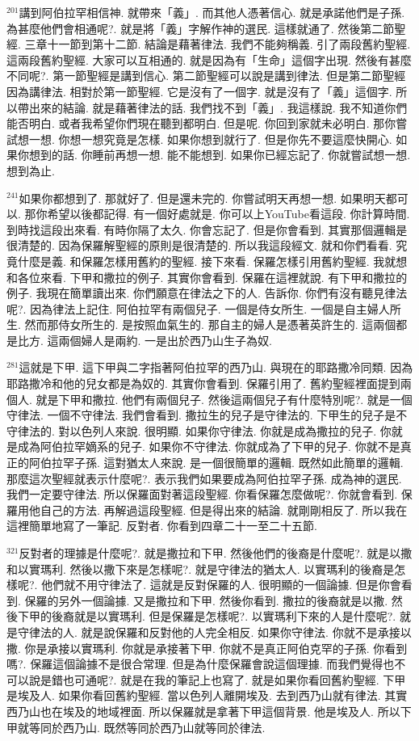 \documentclass{book}
\begin{document}
$^{201}$講到阿伯拉罕相信神.
就帶來「義」.
而其他人憑著信心.
就是承諾他們是子孫.
為甚麼他們會相通呢?.
就是將「義」字解作神的選民.
這樣就通了.
然後第二節聖經.
三章十一節到第十二節.
結論是藉著律法.
我們不能夠稱義.
引了兩段舊約聖經.
這兩段舊約聖經.
大家可以互相通的.
就是因為有「生命」這個字出現.
然後有甚麼不同呢?.
第一節聖經是講到信心.
第二節聖經可以說是講到律法.
但是第二節聖經因為講律法.
相對於第一節聖經.
它是沒有了一個字.
就是沒有了「義」這個字.
所以帶出來的結論.
就是藉著律法的話.
我們找不到「義」.
我這樣說.
我不知道你們能否明白.
或者我希望你們現在聽到都明白.
但是呢.
你回到家就未必明白.
那你嘗試想一想.
你想一想究竟是怎樣.
如果你想到就行了.
但是你先不要這麼快開心.
如果你想到的話.
你睡前再想一想.
能不能想到.
如果你已經忘記了.
你就嘗試想一想.
想到為止.

$^{241}$如果你都想到了.
那就好了.
但是還未完的.
你嘗試明天再想一想.
如果明天都可以.
那你希望以後都記得.
有一個好處就是.
你可以上YouTube看這段.
你計算時間.
到時找這段出來看.
有時你隔了太久.
你會忘記了.
但是你會看到.
其實那個邏輯是很清楚的.
因為保羅解聖經的原則是很清楚的.
所以我這段經文.
就和你們看看.
究竟什麼是義.
和保羅怎樣用舊約的聖經.
接下來看.
保羅怎樣引用舊約聖經.
我就想和各位來看.
下甲和撒拉的例子.
其實你會看到.
保羅在這裡就說.
有下甲和撒拉的例子.
我現在簡單讀出來.
你們願意在律法之下的人.
告訴你.
你們有沒有聽見律法呢?.
因為律法上記住.
阿伯拉罕有兩個兒子.
一個是侍女所生.
一個是自主婦人所生.
然而那侍女所生的.
是按照血氣生的.
那自主的婦人是憑著英許生的.
這兩個都是比方.
這兩個婦人是兩約.
一是出於西乃山生子為奴.

$^{281}$這就是下甲.
這下甲與二字指著阿伯拉罕的西乃山.
與現在的耶路撒冷同類.
因為耶路撒冷和他的兒女都是為奴的.
其實你會看到.
保羅引用了.
舊約聖經裡面提到兩個人.
就是下甲和撒拉.
他們有兩個兒子.
然後這兩個兒子有什麼特別呢?.
就是一個守律法.
一個不守律法.
我們會看到.
撒拉生的兒子是守律法的.
下甲生的兒子是不守律法的.
對以色列人來說.
很明顯.
如果你守律法.
你就是成為撒拉的兒子.
你就是成為阿伯拉罕嫡系的兒子.
如果你不守律法.
你就成為了下甲的兒子.
你就不是真正的阿伯拉罕子孫.
這對猶太人來說.
是一個很簡單的邏輯.
既然如此簡單的邏輯.
那麼這次聖經就表示什麼呢?.
表示我們如果要成為阿伯拉罕子孫.
成為神的選民.
我們一定要守律法.
所以保羅面對著這段聖經.
你看保羅怎麼做呢?.
你就會看到.
保羅用他自己的方法.
再解過這段聖經.
但是得出來的結論.
就剛剛相反了.
所以我在這裡簡單地寫了一筆記.
反對者.
你看到四章二十一至二十五節.

$^{321}$反對者的理據是什麼呢?.
就是撒拉和下甲.
然後他們的後裔是什麼呢?.
就是以撒和以實瑪利.
然後以撒下來是怎樣呢?.
就是守律法的猶太人.
以實瑪利的後裔是怎樣呢?.
他們就不用守律法了.
這就是反對保羅的人.
很明顯的一個論據.
但是你會看到.
保羅的另外一個論據.
又是撒拉和下甲.
然後你看到.
撒拉的後裔就是以撒.
然後下甲的後裔就是以實瑪利.
但是保羅是怎樣呢?.
以實瑪利下來的人是什麼呢?.
就是守律法的人.
就是說保羅和反對他的人完全相反.
如果你守律法.
你就不是承接以撒.
你是承接以實瑪利.
你就是承接著下甲.
你就不是真正阿伯克罕的子孫.
你看到嗎?.
保羅這個論據不是很合常理.
但是為什麼保羅會說這個理據.
而我們覺得也不可以說是錯也可通呢?.
就是在我的筆記上也寫了.
就是如果你看回舊約聖經.
下甲是埃及人.
如果你看回舊約聖經.
當以色列人離開埃及.
去到西乃山就有律法.
其實西乃山也在埃及的地域裡面.
所以保羅就是拿著下甲這個背景.
他是埃及人.
所以下甲就等同於西乃山.
既然等同於西乃山就等同於律法.
\end{document}
